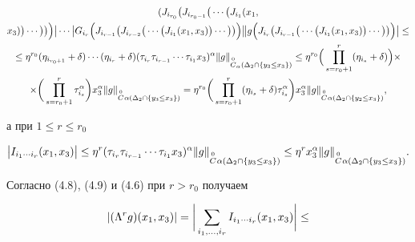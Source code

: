 \begin{pf}
\begin{gather}
(J_{i_{r_0}}\big (J_{i_{r_0-1}}\big (\cd \big (J_{i_1}(x_1,\notag \\


%


x_3)\big )\cd \big )\big )\Big ) \big | \cd \big |G_{i_r}\Big (J_{i_{r-1}}\big


(J_{i_{r-2}}\big (\cd \big (J_{i_1}(x_1,x_3)\big )\cd \big )\big )\Big )\big\|


g \Big (J_{i_r}\big (J_{i_{r-1}}\big (\cd \big (J_{i_1}(x_1,x_3)\big )


\cd \big )\big )\Big )\big |\leq\notag \\


%


\leq \eta^{r_0}(\eta_{i_{r_0+1}}+\dl)\cd (\eta_{i_r}+\dl)(\tau_{i_r}


\tau_{i_{r-1}}\cd \tau_{i_1}x_3)^\al \|g\|_{\oc_\al(\Delta_2\cap \{y_3 \leq


x_3 \})}\leq \eta^{r_0}\Big(\prod_{s=r_0+1}^r(\eta_{i_s}+\dl)\Big)\tm\notag \\


%


\tm \bigg (\prod_{s=r_0+1}^r\tau_{i_s}^\al\bigg )x_3^\al \|g\|_{\oc_{}\al


(\Delta_2\cap \{y_3 \leq x_3 \})}=\eta^{r_0}\bigg (\prod_{s=r_0+1}^r


(\eta_{i_s}+\dl)\tau_{i_s}^\al \bigg )x_3^\al \|g\|_{\oc_{}\al (\Delta_2\cap


\{y_2 \leq x_3 \})},


\end{gather}


а при $1\leq r\leq r_0$




\begin{equation}


\big |I_{i_1\cd i_r}(x_1,x_3)\big |\leq \eta^r(\tau_{i_r}\tau_{i_{r-1}}\cd


\tau_{i_1}x_3)^\al \|g\|_{\oc_{}\al(\Delta_2\cap \{y_3 \leq x_3 \})}\leq


\eta^r x_3^\al \|g\|_{\oc_{}\al(\Delta_2\cap \{y_3 \leq x_3 \})}.


\end{equation}


Согласно (4.8), (4.9) и (4.6) при $r>r_0$ получаем




\begin{gather}


|(\Lb^r g)(x_1,x_3)|=\bigg|\sum_{i_1,\ds,i_r}I_{i_1\cd i_r}(x_1,x_3)\bigg|\le



\end{gather}
\end{pf}
